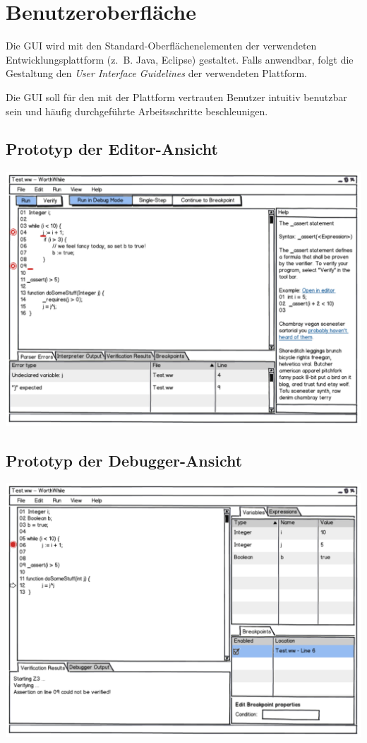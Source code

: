 \section{Benutzeroberfläche}%

Die GUI wird mit den Standard-Oberflächenelementen der verwendeten Entwicklungsplattform (z.~B. Java, Eclipse) gestaltet. Falls anwendbar, folgt die Gestaltung den \emph{User Interface Guidelines} der verwendeten Plattform.

Die GUI soll für den mit der Plattform vertrauten Benutzer intuitiv benutzbar sein und häufig durchgeführte Arbeitsschritte beschleunigen.

\subsection{Prototyp der Editor-Ansicht}%

\includegraphics[width=\textwidth]{mockup/editor.pdf}

\subsection{Prototyp der Debugger-Ansicht}%

\includegraphics[width=\textwidth]{mockup/debug.pdf}
